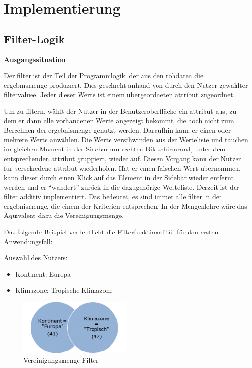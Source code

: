 \chapter{Implementierung}
\section{Filter-Logik} \label{sec:implFilter}
\textbf{Ausgangssituation}

Der \gls{filter} ist der Teil der Programmlogik, der aus den \gls{rohdaten} die \gls{ergebnismenge} produziert. Dies geschieht anhand von durch den Nutzer gewählter \gls{filtervalue}e. Jeder dieser Werte ist einem übergeordneten \gls{attribut} zugeordnet.

Um zu filtern, wählt der Nutzer in der Benutzeroberfläche ein \gls{attribut} aus, zu dem er dann alle vorhandenen Werte angezeigt bekommt, die noch nicht zum Berechnen der \gls{ergebnismenge} genutzt werden. Daraufhin kann er einen oder mehrere Werte anwählen. Die Werte verschwinden aus der Werteliste und tauchen im gleichen Moment in der Sidebar am rechten Bildschirmrand, unter dem entsprechenden \gls{attribut} gruppiert, wieder auf. Diesen Vorgang kann der Nutzer für verschiedene \gls{attribut} wiederholen. Hat er einen falschen Wert übernommen, kann dieser durch einen Klick auf das Element in der Sidebar wieder entfernt werden und er \enquote{wandert} zurück in die dazugehörige Werteliste.
Derzeit ist der \gls{filter} additiv implementiert. Das bedeutet, es sind immer alle \gls{filter} in der \gls{ergebnismenge}, die einem der Kriterien entsprechen. In der Mengenlehre wäre das Äquivalent dazu die Vereinigungsmenge.

Das folgende Beispiel verdeutlicht die Filterfunktionalität für den ersten Anwendungsfall:

Auswahl des Nutzers:

\begin{itemize}
	\item Kontinent: Europa
	\item Klimazone: Tropische Klimazone
\end{itemize}

\begin{figure}[H]
 \centering
 \includegraphics[width=0.5\textwidth]{grafiken/Filter_Vereinigung.png}
 \caption{Vereinigungsmenge Filter}
 \label{fig:filter1}
\end{figure}

